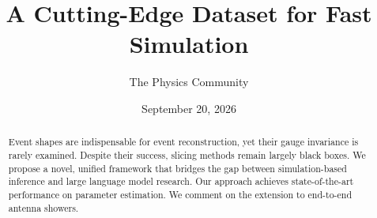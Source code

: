 \documentclass[11pt]{article}
\title{A Cutting-Edge Dataset for Fast Simulation}
\author{The Physics Community}
\date{September 20, 2026}
\numberwithin{equation}{section}
\theoremstyle{definition}
\theoremstyle{remark}
\begin{document}
\maketitle
\begin{abstract}
Event shapes are indispensable for event reconstruction, yet their gauge
invariance is rarely examined. Despite their success, slicing methods
remain largely black boxes. We propose a novel, unified framework that
bridges the gap between simulation-based inference and large language
model research. Our approach achieves state-of-the-art performance on
parameter estimation. We comment on the extension to end-to-end antenna
showers.
\end{abstract}
\tableofcontents





\nocite{*}


\end{document}
